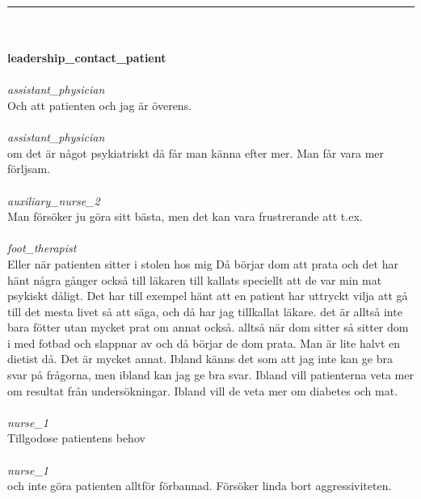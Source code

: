 \documentclass[12pt,a4paper,oneside]{article}
\begin{document}
\hrule

\ \\\ \\{\bf leadership\_contact\_patient }
\\\ \\%
 { \it  assistant\_physician %
}\\
Och att patienten och jag {\"a}r {\"o}verens. %
\ \\\ \\
 { \it   assistant\_physician %
}\\
om det {\"a}r n{\aa}got psykiatriskt d{\aa} f{\aa}r man k{\"a}nna efter mer. Man f{\aa}r vara mer f{\"o}rljsam. %
\ \\\ \\
 { \it   auxiliary\_nurse\_2 %
}\\
Man f{\"o}rs{\"o}ker ju g{\"o}ra sitt b{\"a}sta, men det kan vara frustrerande att t.ex. %
\ \\\ \\
 { \it   foot\_therapist %
}\\
Eller n{\"a}r patienten sitter i stolen hos mig D{\aa} b{\"o}rjar dom att prata och det har h{\"a}nt n{\aa}gra g{\aa}nger ocks{\aa} till l{\"a}karen till kallats speciellt att de var min mat psykiskt d{\aa}ligt. Det har till exempel h{\"a}nt att en patient har uttryckt vilja att g{\aa} till det mesta livet s{\aa} att s{\"a}ga, och d{\aa} har jag tillkallat l{\"a}kare. det {\"a}r allts{\aa} inte bara f{\"o}tter utan mycket prat om annat ocks{\aa}. allts{\aa} n{\"a}r dom sitter s{\aa} sitter dom i med fotbad och slappnar av och d{\aa} b{\"o}rjar de dom prata. Man {\"a}r lite halvt en dietist d{\aa}. Det {\"a}r mycket annat. Ibland k{\"a}nns det som att jag inte kan ge bra svar p{\aa} fr{\aa}gorna, men ibland kan jag ge bra svar. Ibland vill patienterna veta mer om resultat fr{\aa}n unders{\"o}kningar. Ibland vill de veta mer om diabetes och mat.  %
\ \\\ \\
 { \it   nurse\_1 %
}\\
Tillgodose patientens behov %
\ \\\ \\
 { \it   nurse\_1 %
}\\
och inte g{\"o}ra patienten alltf{\"o}r f{\"o}rbannad. F{\"o}rs{\"o}ker linda bort aggressiviteten. %
\end{document}
